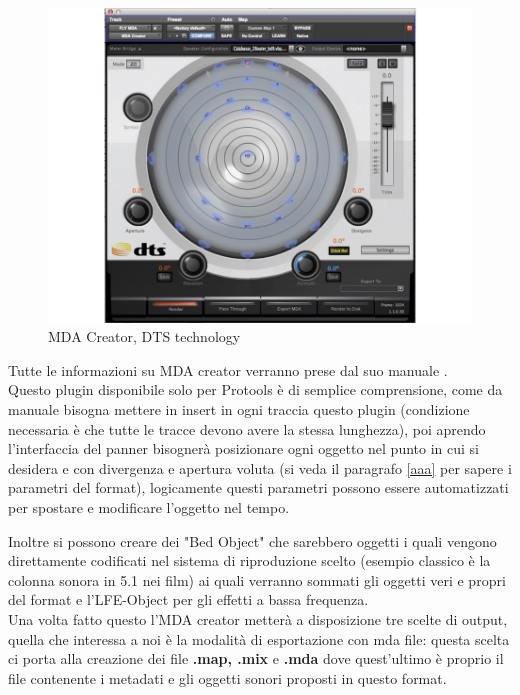 \documentclass[12pt,a4paper]{report}
\begin{document}
\begin{figure}[htbp]
	\centering
	\includegraphics[scale=0.50]{figures/mdacreator.jpg}
	
	\caption {MDA Creator, DTS technology} 
	\label{fig:mdacreator}
	\end{figure}

Tutte le informazioni su MDA creator verranno prese dal suo manuale \cite{creator}.\\

Questo plugin disponibile solo per Protools è di semplice comprensione, come da manuale bisogna mettere in insert in ogni traccia questo plugin (condizione necessaria è che tutte le tracce devono avere la stessa lunghezza), poi aprendo l'interfaccia del panner bisognerà posizionare ogni oggetto nel punto in cui si desidera e con divergenza e apertura voluta (si veda il paragrafo \ref{aaa} per sapere i parametri del format), logicamente questi parametri possono essere automatizzati per spostare e modificare l'oggetto nel tempo.

Inoltre si possono creare dei "Bed Object" che sarebbero oggetti i quali vengono direttamente codificati nel sistema di riproduzione scelto (esempio classico è la colonna sonora in 5.1 nei film) ai quali verranno sommati gli oggetti veri e propri del format e l'LFE-Object per gli effetti a bassa frequenza.\\

Una volta fatto questo l'MDA creator metterà a disposizione tre scelte di output, quella che interessa a noi è la modalità di esportazione con mda file: questa scelta ci porta alla creazione dei file \textbf{.map, .mix} e \textbf{.mda} dove quest'ultimo è proprio il file contenente i metadati e gli oggetti sonori proposti in questo format.
\end{document}
